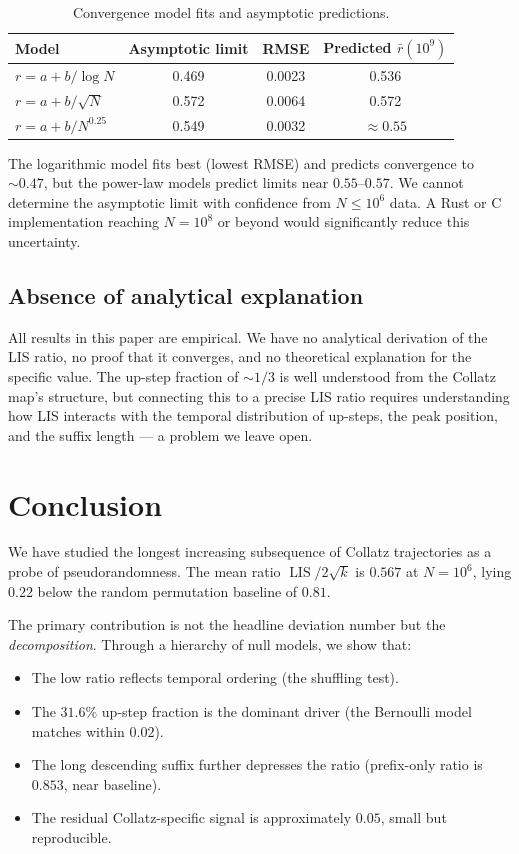 \documentclass[11pt]{article}
\theoremstyle{definition}
\theoremstyle{remark}
\newcommand{\LIS}{\operatorname{LIS}}
\begin{document}
\begin{table}[ht]
\centering
\caption{Convergence model fits and asymptotic predictions.}
\label{tab:convergence}
\begin{tabular}{@{}lccc@{}}
\toprule
Model & Asymptotic limit & RMSE & Predicted $\bar{r}(10^9)$ \\
\midrule
$r = a + b/\log N$  & 0.469 & 0.0023 & 0.536 \\
$r = a + b/\sqrt{N}$ & 0.572 & 0.0064 & 0.572 \\
$r = a + b/N^{0.25}$ & 0.549 & 0.0032 & $\approx 0.55$ \\
\bottomrule
\end{tabular}
\end{table}

The logarithmic model fits best (lowest RMSE) and predicts convergence to
$\sim 0.47$, but the power-law models predict limits near $0.55$--$0.57$.
We cannot determine the asymptotic limit with confidence from $N \leq 10^6$
data. A Rust or C implementation reaching $N = 10^8$ or beyond would
significantly reduce this uncertainty.

\subsection{Absence of analytical explanation}

All results in this paper are empirical. We have no analytical derivation
of the LIS ratio, no proof that it converges, and no theoretical
explanation for the specific value. The up-step fraction of $\sim 1/3$ is
well understood from the Collatz map's structure, but connecting this to a
precise LIS ratio requires understanding how LIS interacts with the
temporal distribution of up-steps, the peak position, and the suffix
length --- a problem we leave open.

\section{Conclusion}\label{sec:conclusion}

We have studied the longest increasing subsequence of Collatz trajectories
as a probe of pseudorandomness. The mean ratio $\LIS/2\sqrt{k}$ is
$0.567$ at $N = 10^6$, lying $0.22$ below the random permutation baseline
of $0.81$.

The primary contribution is not the headline deviation number but the
\emph{decomposition}. Through a hierarchy of null models, we show that:
\begin{itemize}
  \item The low ratio reflects temporal ordering (the shuffling test).
  \item The $31.6\%$ up-step fraction is the dominant driver (the Bernoulli
    model matches within $0.02$).
  \item The long descending suffix further depresses the ratio (prefix-only
    ratio is $0.853$, near baseline).
  \item The residual Collatz-specific signal is approximately $0.05$,
    small but reproducible.
\end{itemize}
\end{document}
